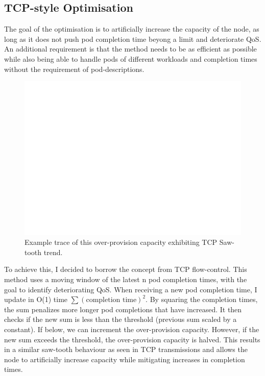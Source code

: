 \subsection{TCP-style Optimisation}
The goal of the optimisation is to artificially increase the capacity of the
node, as long as it does not push pod completion time beyong a limit and
deteriorate QoS. An additional requirement is that the method needs to be as
efficient as possible while also being able to handle pods of different
workloads and completion times without the requirement of pod-descriptions.


\begin{figure}[h]
    \centering
    \includegraphics[width=\textwidth]{images/blank.pdf}
    \caption{Example trace of this over-provision capacity exhibiting TCP
    Saw-tooth trend.}
    \label{fig:overprovision-sawtooth}
\end{figure}

To achieve this, I decided to borrow the concept from TCP flow-control. This
method uses a moving window of the latest n pod completion times, with the goal
to identify deteriorating QoS. When receiving a new pod completion time, I
update in O(1) time $\sum (\text{completion time})^2$. By squaring the
completion times, the sum penalizes more longer pod completions that have
increased. It then checks if the new sum is less than the threshold (previous
sum scaled by a constant). If below, we can increment the over-provision
capacity. However, if the new sum exceeds the threshold, the over-provision
capacity is halved. This results in a similar saw-tooth behaviour as seen in TCP
transmissions and allows the node to artificially increase capacity while
mitigating increases in completion times.

